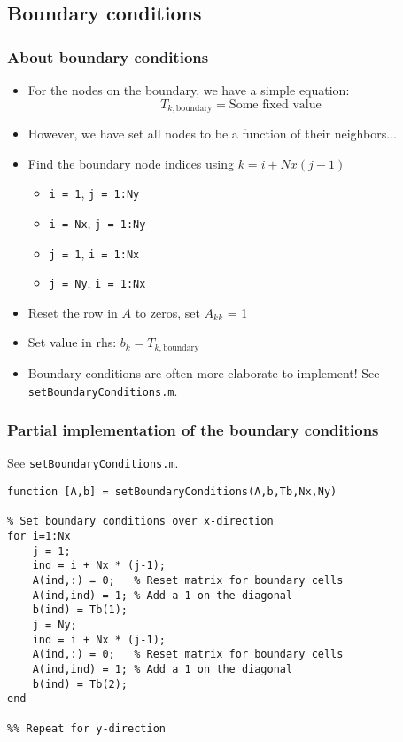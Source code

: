 \subsection*{Boundary conditions}
\begin{frame}[fragile]
  \frametitle{About boundary conditions}
  \begin{itemize}
    \item For the nodes on the boundary, we have a simple equation:
    \[
      T_{k,\text{boundary}} = \text{Some fixed value}
      \]
      \item However, we have set all nodes to be a function of their neighbors...
      \item Find the boundary node indices using $k = i + Nx(j-1)$
      \begin{itemize}
        \item \lstinline$i = 1$, \lstinline$j = 1:Ny$
        \item \lstinline$i = Nx$, \lstinline$j = 1:Ny$
        \item \lstinline$j = 1$, \lstinline$i = 1:Nx$
        \item \lstinline$j = Ny$, \lstinline$i = 1:Nx$
      \end{itemize}
      \item Reset the row in $A$ to zeros, set $A_{kk}$ = 1
      \item Set value in rhs: $b_k = T_{k,\text{boundary}}$
      \item Boundary conditions are often more elaborate to implement! See \lstinline$setBoundaryConditions.m$.
  \end{itemize}
\end{frame}
  
\begin{frame}[fragile]
  \frametitle{Partial implementation of the boundary conditions}
  See \lstinline$setBoundaryConditions.m$.
  \begin{lstlisting}[]
function [A,b] = setBoundaryConditions(A,b,Tb,Nx,Ny)

% Set boundary conditions over x-direction
for i=1:Nx
    j = 1;
    ind = i + Nx * (j-1);
    A(ind,:) = 0;   % Reset matrix for boundary cells
    A(ind,ind) = 1; % Add a 1 on the diagonal
    b(ind) = Tb(1);
    j = Ny;
    ind = i + Nx * (j-1);
    A(ind,:) = 0;   % Reset matrix for boundary cells
    A(ind,ind) = 1; % Add a 1 on the diagonal
    b(ind) = Tb(2);
end

%% Repeat for y-direction
  \end{lstlisting}
\end{frame}

